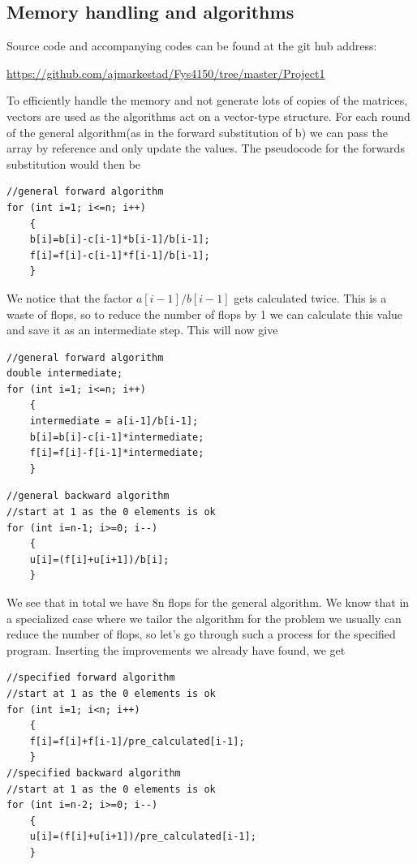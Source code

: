 \documentclass[a4paper,11pt]{article}
\begin{document}
{	
\subsection{Memory handling and algorithms}

Source code and accompanying codes can be found at the git hub address:

\url{https://github.com/ajmarkestad/Fys4150/tree/master/Project1} 



To efficiently handle the memory and not generate lots of copies of the matrices, vectors are used as the algorithms act on a vector-type structure. For each round of the general algorithm(as in the forward substitution of b) we can pass the array by reference and only update the values. The pseudocode for the forwards substitution would then be
\begin{lstlisting}
//general forward algorithm
for (int i=1; i<=n; i++)
	{
	b[i]=b[i]-c[i-1]*b[i-1]/b[i-1];
	f[i]=f[i]-c[i-1]*f[i-1]/b[i-1];
	}
\end{lstlisting}
		
We notice that the factor $a[i-1]/b[i-1]$ gets calculated twice. This is a waste of flops, so to reduce the number of flops by 1 we can calculate this value and save it as an intermediate step. This will now give

\begin{lstlisting}
//general forward algorithm
double intermediate; 
for (int i=1; i<=n; i++)
	{
	intermediate = a[i-1]/b[i-1];
	b[i]=b[i]-c[i-1]*intermediate;
	f[i]=f[i]-f[i-1]*intermediate;
	}
\end{lstlisting}
		
\begin{lstlisting}
//general backward algorithm
//start at 1 as the 0 elements is ok
for (int i=n-1; i>=0; i--)
	{
	u[i]=(f[i]+u[i+1])/b[i];
	}
\end{lstlisting}
		
We see that in total we have 8n flops for the general algorithm. We know that in a specialized case where we tailor the algorithm for the problem we usually can reduce the number of flops, so let's go through such a process for the specified program. Inserting the improvements we already have found, we get
		
\begin{lstlisting}
//specified forward algorithm
//start at 1 as the 0 elements is ok
for (int i=1; i<n; i++)
	{
	f[i]=f[i]+f[i-1]/pre_calculated[i-1];
	}
//specified backward algorithm
//start at 1 as the 0 elements is ok
for (int i=n-2; i>=0; i--)
	{
	u[i]=(f[i]+u[i+1])/pre_calculated[i-1];
	}
\end{lstlisting}
		
}
\end{document}

